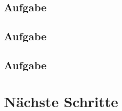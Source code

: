 \documentclass{article}
\begin{document}
\subsection{Aufgabe}


\subsection{Aufgabe}


\subsection{Aufgabe}



\section{Nächste Schritte}
\end{document}
